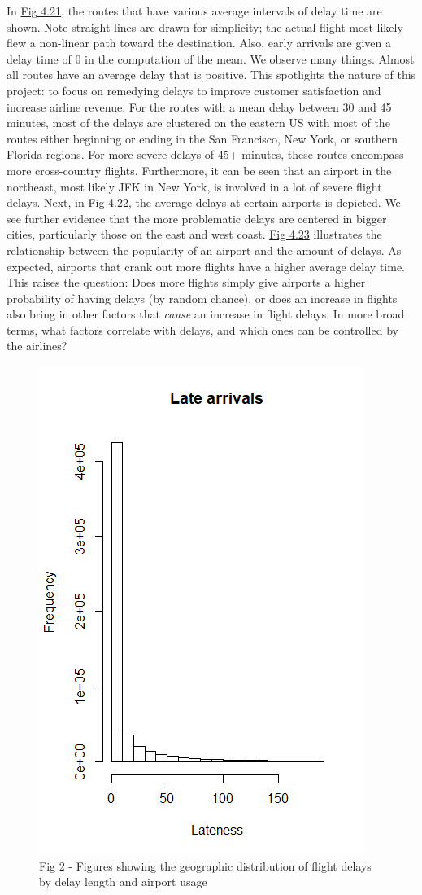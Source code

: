 \documentclass[12pt, a4paper, openany]{book}
\newcommand\tab[1][1cm]{\hspace*{#1}}
\begin{document}
			\tab In \underline{Fig 4.21}, the routes that have various average intervals of delay time are shown. Note straight lines are drawn for simplicity; the actual flight most likely flew a non-linear path toward the destination. Also, early arrivals are given a delay time of 0 in the computation of the mean. We observe many things. Almost all routes have an average delay that is positive. This spotlights the nature of this project: to focus on remedying delays to improve customer satisfaction and increase airline revenue. For the routes with a mean delay between 30 and 45 minutes, most of the delays are clustered on the eastern US with most of the routes either beginning or ending in the San Francisco, New York, or southern Florida regions. For more severe delays of 45+ minutes, these routes encompass more cross-country flights. Furthermore, it can be seen that an airport in the northeast, most likely JFK in New York, is involved in a lot of severe flight delays. Next, in \underline{Fig 4.22}, the average delays at certain airports is depicted. We see further evidence that the more problematic delays are centered in bigger cities, particularly those on the east and west coast. \underline{Fig 4.23} illustrates the relationship between the popularity of an airport and the amount of delays. As expected, airports that crank out more flights have a higher average delay time. This raises the question: Does more flights simply give airports a higher probability of having delays (by random chance), or does an increase in flights also bring in other factors that \textit{cause} an increase in flight delays. In more broad terms, what factors correlate with delays, and which ones can be controlled by the airlines?\\
			\begin{figure}
			\centering
	 		\includegraphics[width = .45 \textwidth]{../figures/LateArrivalsHistogram}
	 		\caption{Fig 2 - Figures showing the geographic distribution of flight delays by delay length and airport usage}
	 		\end{figure}
	 		
\end{document}
